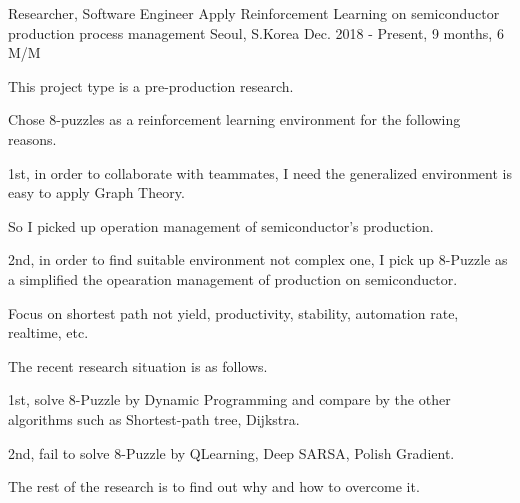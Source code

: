 \begin{cventries}
  \cventry
    {Researcher, Software Engineer} %
    {Apply Reinforcement Learning on semiconductor production process management} %
    {Seoul, S.Korea} %
    {Dec. 2018 - Present, 9 months, 6 M/M} %
    {
      \begin{cvitems} %
        \item {This project type is a pre-production research.}
        \item {Chose 8-puzzles as a reinforcement learning environment for the following reasons.}
        \item {1st, in order to collaborate with teammates, I need the generalized environment is easy to apply Graph Theory.}
        \item {So I picked up operation management of semiconductor's production.}
        \item {2nd, in order to find suitable environment not complex one, I pick up 8-Puzzle as a simplified the opearation management of production on semiconductor.}
        \item {Focus on shortest path not yield, productivity, stability, automation rate, realtime, etc.}
        \item {The recent research situation is as follows.}
        \item {1st, solve 8-Puzzle by Dynamic Programming and compare by the other algorithms such as Shortest-path tree, Dijkstra.}
        \item {2nd, fail to solve 8-Puzzle by QLearning, Deep SARSA, Polish Gradient.}
        \item {The rest of the research is to find out why and how to overcome it.}
      \end{cvitems}
    }


\end{cventries}

